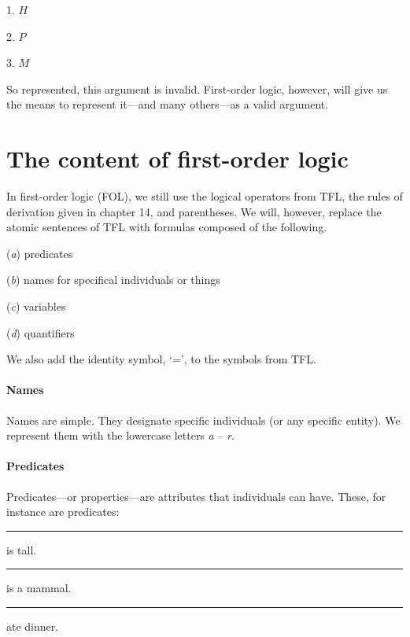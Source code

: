 \noindent\begin{minipage}{0.99\textwidth}
\bigskip
\begin{earg}
\item[1.] $H$
\item[2.] $P$
\item[3.] $M$
\end{earg}
\smallskip
\end{minipage}

\noindent So represented, this argument is invalid. First-order logic, however, will give us the means to represent it---and many others---as a valid argument.


\section{The content of first-order logic}

In first-order logic (FOL), we still use the logical operators from TFL, the rules of derivation given in chapter 14, and parentheses. We will, however, replace the atomic sentences of TFL with formulas composed of the following.

\begin{ebullet}
	\item[(\textit{a})] predicates
	\item[(\textit{b})] names for specifical individuals or things 
	\item[(\textit{c})] variables 
	\item[(\textit{d})] quantifiers
\end{ebullet}
We also add the identity symbol, ‘=’, to the symbols from TFL.  


\paragraph{Names}

Names are simple. They designate specific individuals (or any specific entity). We represent them with the lowercase letters \textit{a} -- \textit{r}.

\paragraph{Predicates}

Predicates---or properties---are attributes that individuals can have. These, for instance are predicates:

\begin{ebullet}
	\item[] \rule{1cm}{0.15mm} is tall.
	\item[] \rule{1cm}{0.15mm} is a mammal.
	\item[] \rule{1cm}{0.15mm} ate dinner.
\end{ebullet}

